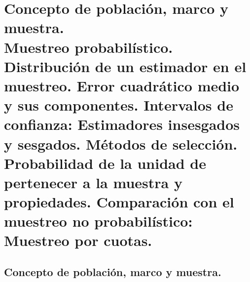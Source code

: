 
\chapter[Concepto de poblaci\'on, marco y muestra.]{Concepto de poblaci\'on, marco y muestra.\\
	\normalsize Muestreo probabil\'istico. Distribuci\'on de un estimador en el muestreo. Error cuadr\'atico medio y sus componentes. Intervalos de confianza: Estimadores insesgados y sesgados. M\'etodos de selecci\'on. Probabilidad de la unidad de pertenecer a la muestra y propiedades. Comparaci\'on con el muestreo no probabil\'istico: Muestreo por cuotas.}

\section{Concepto de poblaci\'on, marco y muestra.}

